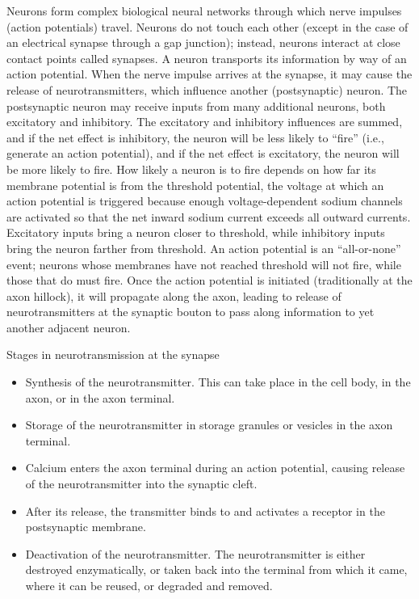 \documentclass[]{book}
\providecommand{\tightlist}{%
  \setlength{\itemsep}{0pt}\setlength{\parskip}{0pt}}
\begin{document}
Neurons form complex biological neural networks through which nerve impulses (action potentials) travel. Neurons do not touch each other (except in the case of an electrical synapse through a gap junction); instead, neurons interact at close contact points called synapses. A neuron transports its information by way of an action potential. When the nerve impulse arrives at the synapse, it may cause the release of neurotransmitters, which influence another (postsynaptic) neuron. The postsynaptic neuron may receive inputs from many additional neurons, both excitatory and inhibitory. The excitatory and inhibitory influences are summed, and if the net effect is inhibitory, the neuron will be less likely to ``fire'' (i.e., generate an action potential), and if the net effect is excitatory, the neuron will be more likely to fire. How likely a neuron is to fire depends on how far its membrane potential is from the threshold potential, the voltage at which an action potential is triggered because enough voltage-dependent sodium channels are activated so that the net inward sodium current exceeds all outward currents. Excitatory inputs bring a neuron closer to threshold, while inhibitory inputs bring the neuron farther from threshold. An action potential is an ``all-or-none'' event; neurons whose membranes have not reached threshold will not fire, while those that do must fire. Once the action potential is initiated (traditionally at the axon hillock), it will propagate along the axon, leading to release of neurotransmitters at the synaptic bouton to pass along information to yet another adjacent neuron.

Stages in neurotransmission at the synapse

\begin{itemize}
\tightlist
\item
  Synthesis of the neurotransmitter. This can take place in the cell body, in the axon, or in the axon terminal.
\item
  Storage of the neurotransmitter in storage granules or vesicles in the axon terminal.
\item
  Calcium enters the axon terminal during an action potential, causing release of the neurotransmitter into the synaptic cleft.
\item
  After its release, the transmitter binds to and activates a receptor in the postsynaptic membrane.
\item
  Deactivation of the neurotransmitter. The neurotransmitter is either destroyed enzymatically, or taken back into the terminal from which it came, where it can be reused, or degraded and removed.
\end{itemize}
\end{document}
